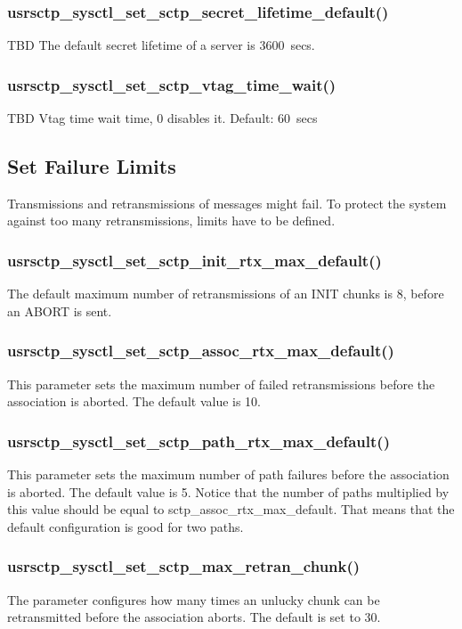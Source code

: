 \documentclass[a4paper]{article}
\begin{document}
\subsubsection{usrsctp\_sysctl\_set\_sctp\_secret\_lifetime\_default()}
TBD
The default secret lifetime of a server is 3600~secs.

\subsubsection{usrsctp\_sysctl\_set\_sctp\_vtag\_time\_wait()}
TBD
Vtag time wait time, 0 disables it. Default: 60~secs


\subsection{Set Failure Limits}
Transmissions and retransmissions of messages might fail. To protect the system against too many
retransmissions, limits have to be defined.

\subsubsection{usrsctp\_sysctl\_set\_sctp\_init\_rtx\_max\_default()}
The default maximum number of retransmissions of an INIT chunks is 8, before an ABORT is sent.

\subsubsection{usrsctp\_sysctl\_set\_sctp\_assoc\_rtx\_max\_default()}
This parameter sets the maximum number of failed retransmissions before the association is aborted.
The default value is 10.

\subsubsection{usrsctp\_sysctl\_set\_sctp\_path\_rtx\_max\_default()}
This parameter sets the maximum number of path failures before the association is aborted.
The default value is 5. Notice that the number of paths multiplied by this value should be 
equal to sctp\_assoc\_rtx\_max\_default. That means that the default configuration is good for two 
paths.

\subsubsection{usrsctp\_sysctl\_set\_sctp\_max\_retran\_chunk()}
The parameter configures how many times an unlucky chunk can be retransmitted before the 
association aborts. The default is set to 30.
				
\end{document}
